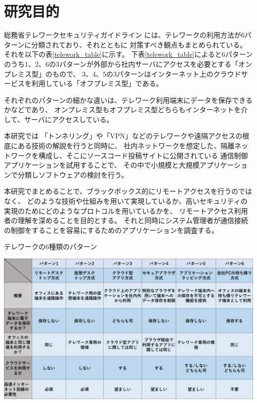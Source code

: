 \documentclass[11pt,a4j,titlepage]{jreport}
\begin{document}
\section{研究目的}


総務省テレワークセキュリティガイドライン \cite{telework_guideline}には、テレワークの利用方法が6パターンに分類されており、それとともに
対策すべき観点もまとめられている。それを以下の表\ref{telework_table}に示す。
下表\ref{telework_table}によると6パターンのうち1、2、6の3パターンが外部から社内サーバにアクセスを必要とする「オンプレミス型」のもので、
3、4、5の3パターンはインターネット上のクラウドサービスを利用している「オフプレミス型」である。

それぞれのパターンの細かな違いは、テレワーク利用端末にデータを保存できるかなどであり、
オンプレミス型もオフプレミス型どちらもインターネットを介して、サーバにアクセスしている。
\par 本研究では
「トンネリング」や「VPN」などのテレワークや遠隔アクセスの根底にある技術の解説を行うと同時に、
社内ネットワークを想定した、隔離ネットワークを構成し、そこにソースコード投稿サイトに公開されている
通信制御アプリケーションを試用することで、
その中で小規模と大規模アプリケーションで分類しソフトウェアの検討を行う。


本研究でまとめることで、ブラックボックス的にリモートアクセスを行うのではなく、
どのような技術や仕組みを用いて実現しているか、高いセキュリティの実現のためにどのようなプロトコルを用いているかを、
リモートアクセス利用者の理解を深めることを目的とする。
それと同時にシステム管理者が通信接続の制御をすることを容易にするためのアプリケーションを調査する。


\begin{table}[tbp]
    \centering
    \caption{テレワークの6種類のパターン}
    \includegraphics*[width=1.0\textwidth,page=1]{graphs/telework_list.pdf}
    \label{telework_table}
\end{table}
\end{document}
